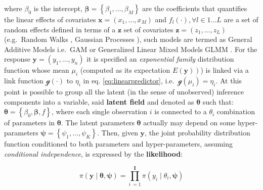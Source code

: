 \documentclass[
  12pt,
  a4paper,
  oneside]{book}
\theoremstyle{definition}
\theoremstyle{definition}
\theoremstyle{definition}
\theoremstyle{remark}
\begin{document}
where \(\beta_{0}\) is the intercept, \(\boldsymbol{\beta}=\left\{\beta_{1}, \ldots, \beta_{M}\right\}\) are the coefficients that quantifies the linear effects of covariates \(\boldsymbol{x}=\left({x}_{1}, \ldots, {x}_{M}\right)\) and \(f_{l}(\cdot), \forall l \in 1 \ldots L\) are a set of random effects defined in terms of a \(\boldsymbol{z}\) set of covariates \(\boldsymbol{z}=\left(z_{1}, \ldots, z_{L}\right)\) (e.g.~Random Walks \citet{GMRFRue}, Gaussian Processes \citet{besag1995conditional}), such models are termed as General Additive Models i.e.~GAM or Generalized Linear Mixed Models GLMM \citep{wang2018bayesian}.
For the response \(\mathbf{y}=\left(y_{1}, \ldots, y_{n}\right)\) it is specified an \emph{exponential family} distribution function whose mean \(\mu_i\) (computed as its expectation \(\left.E\left(\mathbf{y}\right)\right)\)) is linked via a link function \(\mathscr{g}(\cdot)\) to \(\eta_{i}\) in eq. \eqref{eq:linearpredictor}, i.e.~\(\mathscr{g}\left(\mu_i\right)=\eta_{i}\). At this point is possible to group all the latent (in the sense of unobserved) inference components into a variable, said \textbf{latent field} and denoted as \(\boldsymbol{\theta}\) such that: \(\boldsymbol{\theta}=\left\{\beta_{0}, \boldsymbol{\beta}, f\right\}\), where each single observation \(i\) is connected to a \(\theta_{i}\) combination of parameters in \(\boldsymbol{\theta}\).
The latent parameters \(\boldsymbol{\theta}\) actually may depend on some hyper-parameters \(\boldsymbol{\psi} = \left\{\psi_{1}, \ldots, \psi_{K}\right\}\). Then, given \(\mathbf{y}\), the joint probability distribution function conditioned to both parameters and hyper-parameters, assuming \emph{conditional independence}, is expressed by the \textbf{likelihood}:

\begin{equation}
  \pi(\boldsymbol{\mathbf{y}} \mid \boldsymbol{\theta}, \boldsymbol{\psi})=\prod_{i\ = 1}^{\mathbf{I}} \pi\left(y_{i} \mid \theta_{i}, \boldsymbol{\psi}\right)
\label{eq:jpd}
\end{equation}
\end{document}
